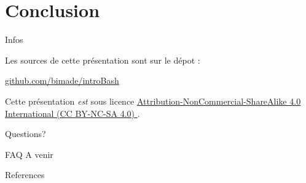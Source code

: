 \documentclass[10pt]{beamer}
\begin{document}
\section{Conclusion}

\begin{frame}{Infos}

  Les sources de cette présentation sont sur le dépot :

  \begin{center}\url{github.com/bimade/introBash}\end{center}

  Cette présentation \emph{est} sous licence
  \href{http://creativecommons.org/licenses/by-nc-sa/4.0/}
  {Attribution-NonCommercial-ShareAlike 4.0 International (CC BY-NC-SA 4.0) }.

  \begin{center}\ccbyncsa\end{center}

\end{frame}

{
\begin{frame}[standout]
  Questions?
\end{frame}
}

\appendix

\begin{frame}[fragile]{FAQ}
  A venir
\end{frame}

\begin{frame}[allowframebreaks]{References}

  
  

\end{frame}
\end{document}

